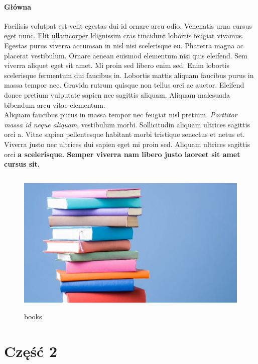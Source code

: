 \documentclass[12pt,a4paper]{article}
\begin{document}
	\subsection{Główna}
	\label{Główna}
	Facilisis volutpat est velit egestas dui id ornare arcu odio. Venenatis urna cursus eget nunc.  \underline{ Elit ullamcorper}  ldignissim cras tincidunt lobortis feugiat vivamus. Egestas purus viverra accumsan in nisl nisi scelerisque eu. Pharetra magna ac placerat vestibulum. Ornare aenean euismod elementum nisi quis eleifend. Sem viverra aliquet eget sit amet. Mi proin sed libero enim sed. Enim lobortis scelerisque fermentum dui faucibus in. Lobortis mattis aliquam faucibus purus in massa tempor nec. Gravida rutrum quisque non tellus orci ac auctor. Eleifend donec pretium vulputate sapien nec sagittis aliquam. Aliquam malesuada bibendum arcu vitae elementum.  \\Aliquam faucibus purus in massa tempor nec feugiat nisl pretium. \textit{Porttitor massa id neque aliquam}, vestibulum morbi. Sollicitudin aliquam ultrices sagittis orci a. Vitae sapien pellentesque habitant morbi tristique senectus et netus et. Viverra justo nec ultrices dui sapien eget mi proin sed. Aliquam ultrices sagittis orci  \textbf{a scelerisque. Semper viverra nam libero justo laoreet sit amet cursus sit.}
	\begin{figure}[H]
		\centering
		\includegraphics[width=\textwidth, height=7cm]{books.jpg}
		\caption{books}
		\label{fig:books}
	\end{figure}
	
	\part{Część 2}
\end{document}
